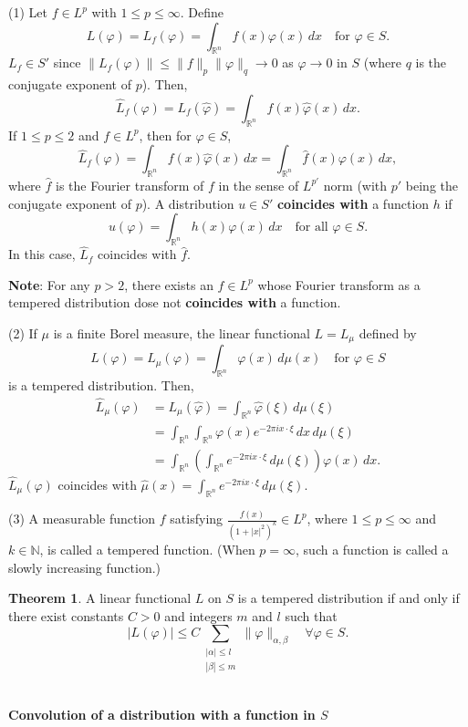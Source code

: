 \documentclass[12pt,openany]{book}
\theoremstyle{definition}
\newtheorem{theorem}{Theorem}[section]
\begin{document}
(1) Let $f \in L^p$ with $1 \leqslant p \leqslant \infty$. Define
$$
L(\varphi) = L_f(\varphi) = \int_{\mathbb{R}^n} f(x) \varphi(x) \, dx \quad \text{for } \varphi \in S.
$$
$L_f \in S'$ since $\|L_f(\varphi)\| \leq \|f\|_p \|\varphi\|_q \rightarrow 0$ as $\varphi \rightarrow 0$ in $S$ (where $q$ is the conjugate exponent of $p$). Then,
$$
\hat{L}_f(\varphi) = L_f(\hat{\varphi}) = \int_{\mathbb{R}^n} f(x) \hat{\varphi}(x) \, dx.
$$
If $1 \leqslant p \leqslant 2$ and $f \in L^p$, then for $\varphi \in S$,
$$
\hat{L}_f(\varphi) = \int_{\mathbb{R}^n} f(x) \hat{\varphi}(x) \, dx = \int_{\mathbb{R}^n} \hat{f}(x) \varphi(x) \, dx,
$$
where $\hat{f}$ is the Fourier transform of $f$ in the sense of $L^{p'}$ norm (with $p'$ being the conjugate exponent of $p$). A distribution $u \in S'$ \textbf{coincides with} a function $h$ if
$$
u(\varphi) = \int_{\mathbb{R}^n} h(x) \varphi(x) \, dx \quad \text{for all } \varphi \in S.
$$
In this case, $\hat{L}_f$ coincides with $\hat{f}$.

\noindent\textbf{Note}: For any $p > 2$, there exists an $f \in L^p$ whose Fourier transform as a tempered distribution dose not \textbf{coincides with} a function.

(2) If $\mu$ is a finite Borel measure, the linear functional $L = L_\mu$ defined by
$$
L(\varphi) = L_\mu(\varphi) = \int_{\mathbb{R}^n} \varphi(x) \, d\mu(x) \quad \text{for } \varphi \in S
$$
is a tempered distribution. Then,
$$
\begin{aligned}
\hat{L}_\mu(\varphi) &= L_\mu(\hat{\varphi}) = \int_{\mathbb{R}^n} \hat{\varphi}(\xi) \, d\mu(\xi) \\
&= \int_{\mathbb{R}^n} \int_{\mathbb{R}^n} \varphi(x) e^{-2\pi i x \cdot \xi} \, dx \, d\mu(\xi) \\
&= \int_{\mathbb{R}^n} \left( \int_{\mathbb{R}^n} e^{-2\pi i x \cdot \xi} \, d\mu(\xi) \right) \varphi(x) \, dx.
\end{aligned}
$$
$\hat{L}_\mu(\varphi)$ coincides with $\hat{\mu}(x) = \int_{\mathbb{R}^n} e^{-2\pi i x \cdot \xi} \, d\mu(\xi)$.

(3) A measurable function $f$ satisfying $\frac{f(x)}{(1+|x|^2)^k} \in L^p$, where $1 \leqslant p \leqslant \infty$ and $k \in \mathbb{N}$, is called a tempered function. (When $p=\infty$, such a function is called a slowly increasing function.)
\begin{theorem}
    A linear functional $L$ on $S$ is a tempered distribution if and only if there exist constants $C > 0$ and integers $m$ and $l$ such that
$$
|L(\varphi)| \leqslant C \sum_{\substack{|\alpha| \leqslant l \\ |\beta| \leqslant m}} \|\varphi\|_{\alpha, \beta} \quad \forall \varphi \in S.
$$
\end{theorem}
~\\
\textbf{\large{Convolution of a distribution with a function in $S$}}
\end{document}

